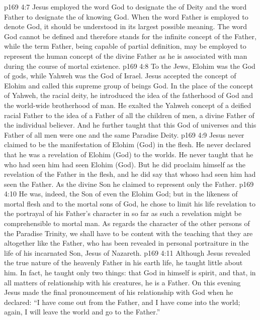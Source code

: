 \vs p169 4:7 Jesus employed the word God to designate the  of Deity and the word Father to designate the  of knowing God. When the word Father is employed to denote God, it should be understood in its largest possible meaning. The word God cannot be defined and therefore stands for the infinite concept of the Father, while the term Father, being capable of partial definition, may be employed to represent the human concept of the divine Father as he is associated with man during the course of mortal existence.
\vs p169 4:8 To the Jews, Elohim was the God of gods, while Yahweh was the God of Israel. Jesus accepted the concept of Elohim and called this supreme group of beings God. In the place of the concept of Yahweh, the racial deity, he introduced the idea of the fatherhood of God and the world\hyp{}wide brotherhood of man. He exalted the Yahweh concept of a deified racial Father to the idea of a Father of all the children of men, a divine Father of the individual believer. And he further taught that this God of universes and this Father of all men were one and the same Paradise Deity.
\vs p169 4:9 Jesus never claimed to be the manifestation of Elohim (God) in the flesh. He never declared that he was a revelation of Elohim (God) to the worlds. He never taught that he who had seen him had seen Elohim (God). But he did proclaim himself as the revelation of the Father in the flesh, and he did say that whoso had seen him had seen the Father. As the divine Son he claimed to represent only the Father.
\vs p169 4:10 He was, indeed, the Son of even the Elohim God; but in the likeness of mortal flesh and to the mortal sons of God, he chose to limit his life revelation to the portrayal of his Father’s character in so far as such a revelation might be comprehensible to mortal man. As regards the character of the other persons of the Paradise Trinity, we shall have to be content with the teaching that they are altogether like the Father, who has been revealed in personal portraiture in the life of his incarnated Son, Jesus of Nazareth.
\pc \vs p169 4:11 Although Jesus revealed the true nature of the heavenly Father in his earth life, he taught little about him. In fact, he taught only two things: that God in himself is spirit, and that, in all matters of relationship with his creatures, he is a Father. On this evening Jesus made the final pronouncement of his relationship with God when he declared: \textcolor{ubdarkred}{“I have come out from the Father, and I have come into the world; again, I will leave the world and go to the Father.”}
